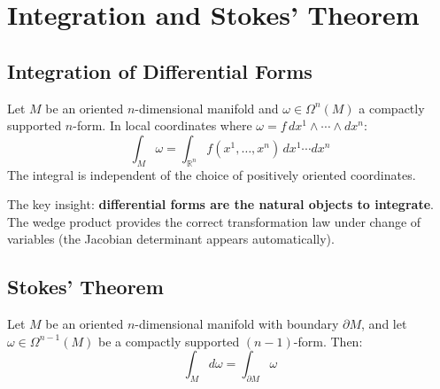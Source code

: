 \chapter{Integration and Stokes' Theorem}

\section{Integration of Differential Forms}

\begin{definition}
    Let $M$ be an oriented $n$-dimensional manifold and $\omega \in \Omega^n(M)$ a compactly supported $n$-form. In local coordinates where $\omega = f \, dx^1 \wedge \cdots \wedge dx^n$:
    \[
        \int_M \omega = \int_{\mathbb{R}^n} f(x^1, \ldots, x^n) \, dx^1 \cdots dx^n
    \]
    The integral is independent of the choice of positively oriented coordinates.
\end{definition}

\begin{remark}
    The key insight: \textbf{differential forms are the natural objects to integrate}. The wedge product provides the correct transformation law under change of variables (the Jacobian determinant appears automatically).
\end{remark}

\section{Stokes' Theorem}

\begin{theorem}
    Let $M$ be an oriented $n$-dimensional manifold with boundary $\partial M$, and let $\omega \in \Omega^{n-1}(M)$ be a compactly supported $(n-1)$-form. Then:
    \[
        \boxed{\int_M d\omega = \int_{\partial M} \omega}
    \]
\end{theorem}

\begin{center}
\end{center}

